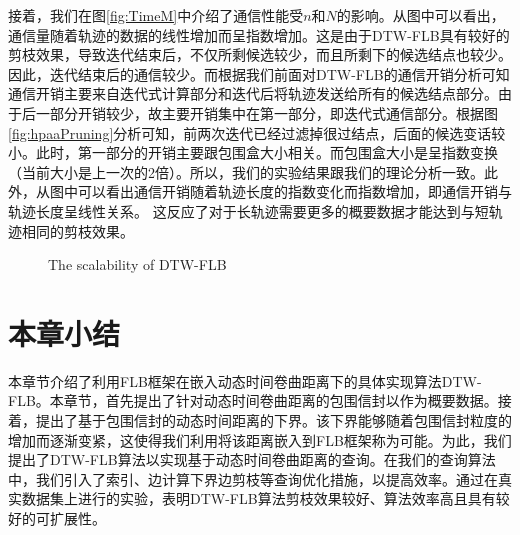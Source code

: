   接着，我们在图\ref{fig:TimeM}中介绍了通信性能受$n$和$N$的影响。从图中可以看出，通信量随着轨迹的数据的线性增加而呈指数增加。这是由于DTW-FLB具有较好的剪枝效果，导致迭代结束后，不仅所剩候选较少，而且所剩下的候选结点也较少。因此，迭代结束后的通信较少。而根据我们前面对DTW-FLB的通信开销分析可知通信开销主要来自迭代式计算部分和迭代后将轨迹发送给所有的候选结点部分。由于后一部分开销较少，故主要开销集中在第一部分，即迭代式通信部分。根据图\ref{fig:hpaaPruning}分析可知，前两次迭代已经过滤掉很过结点，后面的候选变话较小。此时，第一部分的开销主要跟包围盒大小相关。而包围盒大小是呈指数变换（当前大小是上一次的2倍）。所以，我们的实验结果跟我们的理论分析一致。此外，从图中可以看出通信开销随着轨迹长度的指数变化而指数增加，即通信开销与轨迹长度呈线性关系。
   这反应了对于长轨迹需要更多的概要数据才能达到与短轨迹相同的剪枝效果。

   \begin{figure} [t]
   	\centering
   	\caption{The scalability  of DTW-FLB}
   	\label{fig:HpaaScalability}
   \end{figure}
   
  
  \section{本章小结}\label{sec-c5-conclusion}
本章节介绍了利用FLB框架在嵌入动态时间卷曲距离下的具体实现算法DTW-FLB。本章节，首先提出了针对动态时间卷曲距离的包围信封以作为概要数据。接着，提出了基于包围信封的动态时间距离的下界。该下界能够随着包围信封粒度的增加而逐渐变紧，这使得我们利用将该距离嵌入到FLB框架称为可能。为此，我们提出了DTW-FLB算法以实现基于动态时间卷曲距离的查询。在我们的查询算法中，我们引入了索引、边计算下界边剪枝等查询优化措施，以提高效率。通过在真实数据集上进行的实验，表明DTW-FLB算法剪枝效果较好、算法效率高且具有较好的可扩展性。



